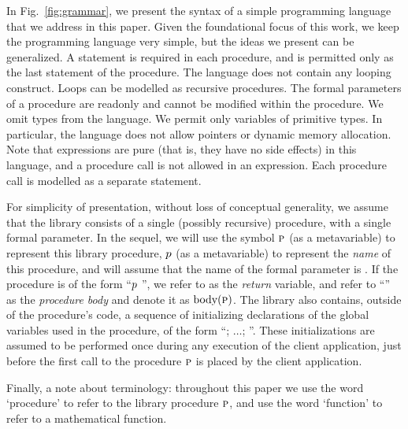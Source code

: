 In Fig.~\ref{fig:grammar}, we present the syntax of a simple
programming language that we address in this paper.
Given the foundational focus of this work, we keep the programming
language very simple, but the ideas we present can be generalized.
A  statement is required in each procedure,
and is permitted only as the last
statement of the procedure.
The language does not contain any looping construct.
Loops can be modelled as recursive procedures.
The formal parameters of a procedure are readonly and cannot be
modified within the procedure.
We omit types from the language. We permit only variables of primitive types.
In particular, the language does not allow pointers or dynamic memory allocation.
Note that expressions are pure (that is, they have no side effects) in this language, and a procedure call
is not allowed in an expression. Each procedure call is modelled as a
separate statement.

For simplicity of presentation, without loss of conceptual generality, we assume
that the library consists of a single (possibly recursive) procedure, with a single formal
parameter.
In the sequel, we will use the symbol $\textsc{p}$ (as a metavariable) to
represent this library procedure, $p$ (as a metavariable) to
represent the \emph{name} of this procedure, and will assume that the name
of the formal parameter is . 
If the procedure is of the form ``$p$ '', we refer to  as the \emph{return}
variable, and  refer to ``'' as the \emph{procedure body}
and denote it as $\text{body}(\textsc{p})$.
The library also contains, outside of the procedure's code,
a sequence of initializing declarations of
the global variables used in the procedure, of the form ``;
$\ldots$; ''. These initializations are assumed to be
performed  once during any execution of the client application,
just before the first call to the
procedure $\textsc{p}$ is placed by the client application.

 Finally, a note about terminology: throughout this paper we
 use the word `procedure' to refer to the library procedure $\textsc{p}$, and
 use the word
`function' to refer to a mathematical function.
